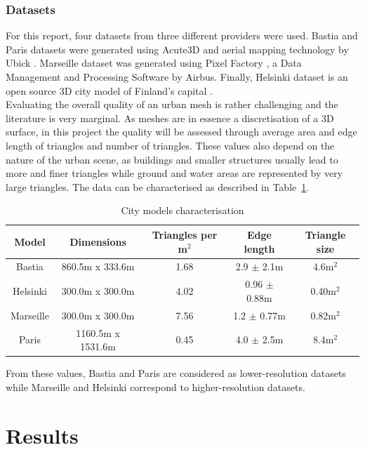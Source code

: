 \documentclass{kththesis}
\begin{document}
\subsection{Datasets} 
For this report, four datasets from three different providers were used. Bastia and Paris datasets were generated using Acute3D and aerial mapping technology by Ubick \parencite{acute3D}. Marseille dataset was generated using Pixel Factory \parencite{pixel_factory}, a Data Management and Processing Software by Airbus. Finally, Helsinki dataset is an open source 3D city model of Finland's capital \parencite{helsinki}. \\
Evaluating the overall quality of an urban mesh is rather challenging and the literature is very marginal. As meshes are in essence a discretisation of a 3D surface, in this project the quality will be assessed through average area and edge length of triangles and number of triangles. These values also depend on the nature of the urban scene, as buildings and smaller structures usually lead to more and finer triangles while ground and water areas are represented by very large triangles.  The data can be characterised as described in Table~\ref{table:city_models}. \\

\begin{table}[H]
\centering 
\begin{tabular}{|c|c|c|c|c|}
\hline
\textbf{Model} & \textbf{Dimensions} & \textbf{Triangles per m$^2$} & \textbf{Edge length} & \textbf{Triangle size} \\
\hline
Bastia & 860.5m x  333.6m & 1.68 & 2.9 $\pm$ 2.1m & 4.6m$^2$ \\
\hline
Helsinki & 300.0m x 300.0m & 4.02 &  0.96 $\pm$ 0.88m & 0.40m$^2$ \\
\hline
Marseille & 300.0m x 300.0m & 7.56 &  1.2 $\pm$ 0.77m & 0.82m$^2$ \\
\hline
Paris  & 1160.5m x 1531.6m & 0.45 & 4.0 $\pm$ 2.5m & 8.4m$^2$ \\
\hline
\end{tabular} 
\caption{City models characterisation}
\label{table:city_models}
\end{table}
From these values, Bastia and Paris are considered as lower-resolution datasets while Marseille and Helsinki correspond to higher-resolution datasets. 
\chapter{Results}
\end{document}

